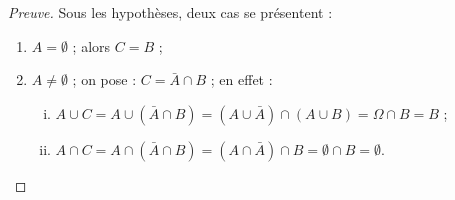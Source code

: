 \begin{proof}[Preuve]
Sous les hypothèses, deux cas se présentent : 
\begin{enumerate}
\item $A=\emptyset$ ; alors $C=B$ ;
\item $A\not=\emptyset$ ; 
on pose : $C=\bar{A}\cap B$ ; 
en effet :
	\begin{enumerate}[(i)]
	\item 
	$
A\cup C = A\cup (\bar{A}\cap B) = 
	(A\cup \bar{A}) \cap (A\cup B) = \Omega \cap B = B 
	$ ;
	\item 
	$
A\cap C = A\cap (\bar{A}\cap B) = (A\cap \bar{A}) \cap B = 
	\emptyset \cap B = \emptyset
	$.
	\end{enumerate}
\end{enumerate}
\end{proof}


